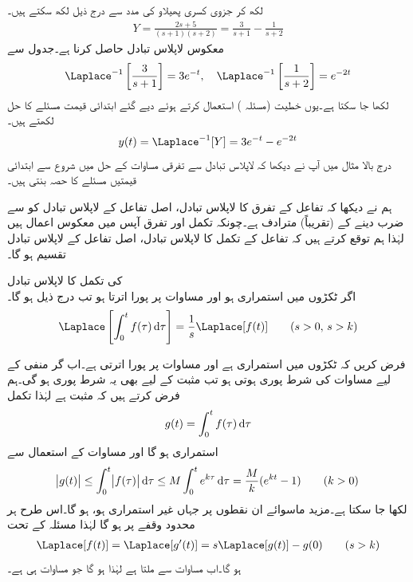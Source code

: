 لکھ کر جزوی کسری پھیلاو کی مدد سے  درج ذیل لکھ سکتے ہیں۔
\begin{align*}
Y=\frac{2s+5}{(s+1)(s+2)}=\frac{3}{s+1}-\frac{1}{s+2}
\end{align*}
 معکوس لاپلاس تبادل حاصل کرنا ہے۔جدول  سے 
\begin{align*}
\Laplace^{-1}\left[\frac{3}{s+1}\right]=3e^{-t}, \quad \Laplace^{-1}\left[\frac{1}{s+2}\right]=e^{-2t}
\end{align*}
لکھا جا سکتا ہے۔یوں خطیت (مسئلہ ) استعمال کرتے ہوئے  دیے گئے ابتدائی قیمت مسئلے کا حل لکھتے ہیں۔
\begin{align*}
y(t)=\Laplace^{-1}[Y]=3e^{-t}-e^{-2t}
\end{align*}
درج بالا مثال میں آپ نے دیکھا کہ لاپلاس تبادل سے تفرقی مساوات کے حل میں شروع سے  ابتدائی قیمتیں مسئلے کا حصہ بنتی ہیں۔

ہم نے دیکھا کہ تفاعل کے تفرق کا لاپلاس تبادل، اصل تفاعل کے لاپلاس تبادل کو  سے ضرب دینے کے (تقریباً) مترادف ہے۔چونکہ تکمل اور تفرق آپس میں معکوس اعمال ہیں لہٰذا ہم توقع کرتے ہیں کہ تفاعل کے تکمل کا لاپلاس تبادل، اصل تفاعل کے لاپلاس تبادل تقسیم  ہو گا۔ 

\quad {} کی تکمل کا لاپلاس تبادل\\
اگر  ٹکڑوں میں استمراری ہو اور مساوات  پر پورا اترتا ہو تب درج ذیل ہو گا۔
\begin{align}\label{مساوات_لاپلاس_تکمل_کا_بدل}
\Laplace\left[\int_{0}^{t} f(\tau) \dif \tau \right]=\frac{1}{s}\Laplace[f(t)]\quad \quad (s>0, \, s>k)
\end{align} 

فرض کریں کہ  ٹکڑوں میں استمراری ہے اور مساوات  پر پورا اترتی ہے۔اب گر منفی  کے لیے  مساوات  کی شرط پوری ہوتی ہو تب مثبت  کے لیے بھی یہ شرط پوری ہو گی۔ہم فرض کرتے ہیں کہ  مثبت ہے لہٰذا تکمل
\begin{align}\label{مساوات_لاپلاس_تفاعل_تکمل}
g(t)=\int_{0}^{t}f(\tau)\dif \tau
\end{align}
استمراری ہو گا اور مساوات  کے استعمال سے
\begin{align*}
\abs{g(t)}\le \int_{0}^{t} \abs{f(\tau)} \dif \tau \le M\int_{0}^{t} e^{k\tau} \dif \tau=\frac{M}{k}(e^{kt}-1)\quad \quad (k>0)
\end{align*}
لکھا جا سکتا ہے۔مزید ماسوائے ان نقطوں پر جہاں  غیر استمراری ہو،  ہو گا۔اس طرح  ہر محدود وقفے پر  ہو گا لہٰذا مسئلہ  کے تحت
\begin{align*}
\Laplace[f(t)]=\Laplace[g'(t)]=s\Laplace[g(t)]-g(0) \quad \quad (s>k)
\end{align*}
ہو گا۔اب مساوات  سے  ملتا ہے لہٰذا  ہو گا جو مساوات  ہی ہے۔


